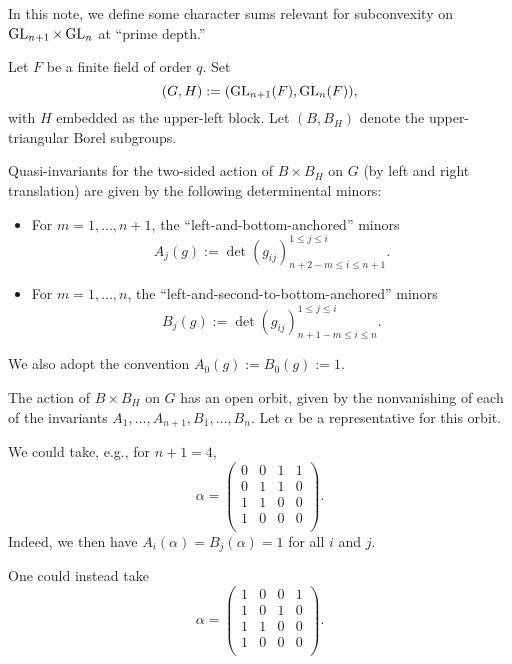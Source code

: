 \documentclass[reqno]{amsart} 
\begin{document}
In this note, we define some character sums relevant for subconvexity on $\operatorname{GL}_{n+1} \times \operatorname{GL}_n$ at ``prime depth.''

Let $F$ be a finite field of order $q$.  Set
\begin{equation*}
  (G,H) := (\operatorname{GL}_{n+1}(F), \operatorname{GL}_n(F)),
\end{equation*}
with $H$ embedded as the upper-left block.  Let $(B, B_H)$ denote the upper-triangular Borel subgroups.

Quasi-invariants for the two-sided action of $B \times B_H$ on $G$ (by left and right translation) are given by the following determinental minors:
\begin{itemize}
\item For $m = 1, \dotsc, n+1$, the ``left-and-bottom-anchored'' minors
  \begin{equation*}
    A_j(g) := \det
    (g_{i j}    )_{
      n+2-m \leq i \leq n+1
    }^{1 \leq j \leq i}.
  \end{equation*}
\item For $m = 1, \dotsc, n$, the ``left-and-second-to-bottom-anchored'' minors
  \begin{equation*}
    B_j(g) := \det
    (g_{i j}    )_{
      n+1-m \leq i \leq n
    }^{1 \leq j \leq i}.
  \end{equation*}
\end{itemize}
We also adopt the convention $A_0(g) := B_0(g) := 1$.

The action of $B \times B_H$ on $G$ has an open orbit, given by the nonvanishing of each of the invariants $A_1,\dotsc,A_{n+1},B_1,\dotsc,B_n$.  Let $\alpha$ be a representative for this orbit.
\begin{example}\label{example:cj59m8hvjh}
We could take, e.g., for $n+1 = 4$,
\begin{equation}\label{eq:cj59nalcll}
\alpha =
\begin{pmatrix}
0 & 0 & 1 & 1 \\
0 & 1 & 1 & 0 \\
1 & 1 & 0 & 0 \\
1 & 0 & 0 & 0 \\
\end{pmatrix}.
\end{equation}
Indeed, we then have $A_i(\alpha) = B_j(\alpha) = 1$ for all $i$ and $j$.
\end{example}
\begin{example}
  One could instead take
  \begin{equation*}
    \alpha =
    \begin{pmatrix}
      1 & 0 & 0 & 1 \\
      1 & 0 & 1 & 0 \\
      1 & 1 & 0 & 0 \\
      1 & 0 & 0 & 0 \\
    \end{pmatrix}.
  \end{equation*}
\end{example}
\end{document}
